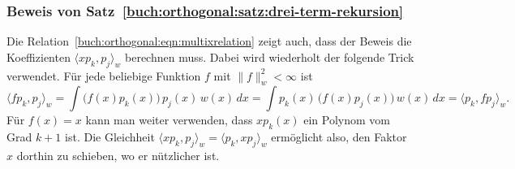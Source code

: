 %
%
\subsubsection{Beweis von Satz~\ref{buch:orthogonal:satz:drei-term-rekursion}}
Die Relation~\eqref{buch:orthogonal:eqn:multixrelation} zeigt auch,
dass der Beweis die Koeffizienten $\langle xp_k,p_j\rangle_w$
berechnen muss.
Dabei wird wiederholt der folgende Trick verwendet.
Für jede beliebige Funktion $f$ mit $\|f\|_w^2<\infty$ ist
\[
\langle fp_k,p_j\rangle_w
=
\int \bigl(f(x)p_k(x)\bigr)\,p_j(x)\,w(x)\,dx
=
\int p_k(x)\,\bigl(f(x)p_j(x)\bigr)\,w(x)\,dx
=
\langle p_k,fp_j\rangle_w.
\]
Für $f(x)=x$ kann man weiter verwenden, dass $xp_k(x)$ ein Polynom
vom Grad $k+1$ ist.
Die Gleichheit $\langle xp_k,p_j\rangle_w=\langle p_k,xp_j\rangle_w$
ermöglicht also, den Faktor $x$ dorthin zu schieben, wo er nützlicher ist.

